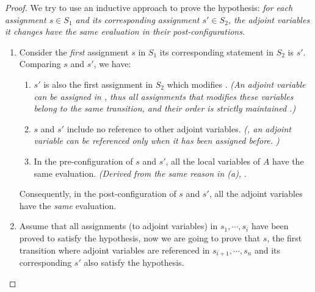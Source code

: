 \begin{proof}
    We try to use an inductive approach to prove the  hypothesis: \emph{for each assignment $s\in S_1$ and its corresponding assignment $s'\in S_2$, the adjoint variables it changes have the same evaluation in their post-configurations.}
    \begin{enumerate}
        \item Consider the \emph{first} assignment $s$ in $S_1$  its corresponding statement in $S_2$ is $s'$. Comparing $s$ and $s'$, we have:
        \begin{enumerate}
            \item $s'$ is also the first assignment in $S_2$ which modifies .
            \emph{(An adjoint variable can be assigned in , thus all assignments that modifies these variables belong to the same transition, and their order is strictly maintained .)}
            \item $s$ and $s'$ include no reference to other adjoint variables. \emph{(, an adjoint variable can be referenced only when it has been assigned before. )}
            \item In the pre-configuration of $s$ and $s'$, all the local variables of $A$ have the same evaluation. \emph{(Derived from the same reason in (a), }.
        \end{enumerate}
        Consequently, in the post-configuration of $s$ and $s'$, all the adjoint variables have the \emph{same} evaluation.

        \item Assume that all assignments (to adjoint variables) in $s_1,\cdots,s_i$ have been proved to satisfy the hypothesis, now we are going to prove that $s$, the first transition where adjoint variables are referenced in $s_{i+1},\cdots,s_n$ and its corresponding $s'$ also satisfy the hypothesis.


\end{enumerate}
\end{proof}

